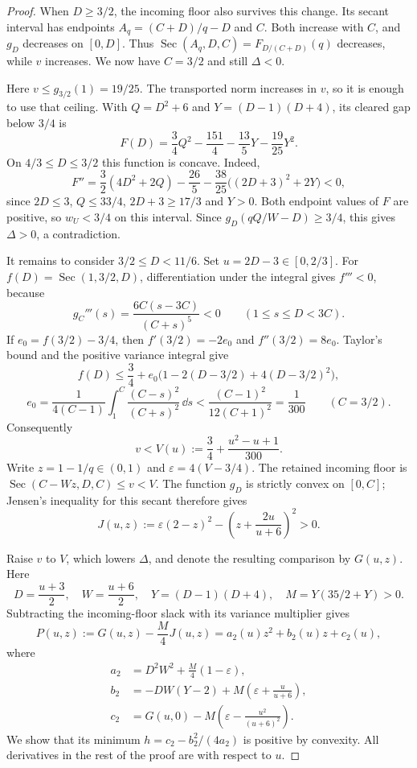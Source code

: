 \begin{proof}
When $D\ge3/2$, the incoming floor also survives this change.
Its secant interval has endpoints $A_q=(C+D)/q-D$ and $C$.
Both increase with $C$, and $g_D$ decreases on $[0,D]$.
Thus $\operatorname{Sec}(A_q,D,C)=F_{D/(C+D)}(q)$ decreases,
while $v$ increases. We now have $C=3/2$ and still $\Delta<0$.

Here $v\le g_{3/2}(1)=19/25$. The transported norm increases in $v$,
so it is enough to use that ceiling. With $Q=D^2+6$ and
$Y=(D-1)(D+4)$, its cleared gap below $3/4$ is
\[
 F(D)=\frac34Q^2-\frac{151}4-\frac{13}5Y-\frac{19}{25}Y^2.
\]
On $4/3\le D\le3/2$ this function is concave. Indeed,
\[
 F''=\frac32(4D^2+2Q)-\frac{26}5
       -\frac{38}{25}\bigl((2D+3)^2+2Y\bigr)<0,
\]
since $2D\le3$, $Q\le33/4$, $2D+3\ge17/3$ and $Y>0$.
Both endpoint values of $F$ are positive, so $w_U<3/4$ on this interval.
Since $g_D(qQ/W-D)\ge3/4$, this gives $\Delta>0$, a contradiction.

It remains to consider $3/2\le D<11/6$. Set $u=2D-3\in[0,2/3]$.
For $f(D)=\operatorname{Sec}(1,3/2,D)$, differentiation under the
integral gives $f'''<0$, because
\[
 g_C'''(s)=\frac{6C(s-3C)}{(C+s)^5}<0\qquad(1\le s\le D<3C).
\]
If $e_0=f(3/2)-3/4$, then $f'(3/2)=-2e_0$ and
$f''(3/2)=8e_0$. Taylor's bound and the positive variance integral give
\[
 f(D)\le\frac34+e_0\bigl(1-2(D-3/2)+4(D-3/2)^2\bigr),
\]
\[
 e_0=\frac1{4(C-1)}\int_1^C\frac{(C-s)^2}{(C+s)^2}\,\dd s
 <\frac{(C-1)^2}{12(C+1)^2}=\frac1{300}\qquad(C=3/2).
\]
Consequently
\[
 v<V(u):=\frac34+\frac{u^2-u+1}{300}.
\]
Write $z=1-1/q\in(0,1)$ and $\varepsilon=4(V-3/4)$.
The retained incoming floor is $\operatorname{Sec}(C-Wz,D,C)\le v<V$.
The function $g_D$ is strictly convex on $[0,C]$; Jensen's inequality
for this secant therefore gives
\[
 J(u,z):=\varepsilon(2-z)^2-\left(z+\frac{2u}{u+6}\right)^2>0.
\]

Raise $v$ to $V$, which lowers $\Delta$, and denote the resulting
comparison by $G(u,z)$. Here
\[
 D=\frac{u+3}2,\quad W=\frac{u+6}2,\quad
 Y=(D-1)(D+4),\quad M=Y(35/2+Y)>0.
\]
Subtracting the incoming-floor slack with its variance multiplier gives
\[
 P(u,z):=G(u,z)-\frac M4J(u,z)=a_2(u)z^2+b_2(u)z+c_2(u),
\]
where
\begin{align*}
 a_2&=D^2W^2+\frac M4(1-\varepsilon),\\
 b_2&=-DW(Y-2)+M\left(\varepsilon+\frac u{u+6}\right),\\
 c_2&=G(u,0)-M\left(\varepsilon-\frac{u^2}{(u+6)^2}\right).
\end{align*}
We show that its minimum $h=c_2-b_2^2/(4a_2)$ is positive by convexity.
All derivatives in the rest of the proof are with respect to $u$.


\end{proof}
